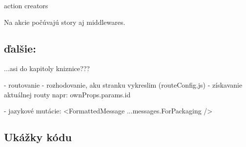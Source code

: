 action creators %

Na akcie počúvajú story aj middlewares.

\subsection{ďalšie:}

...asi do kapitoly kniznice???

- routovanie
  - rozhodovanie, aku stranku vykreslim (routeConfig.js)
  - získavanie aktuálnej routy %
  napr: ownProps.params.id

- jazykové mutácie: <FormattedMessage {...messages.ForPackaging} />

\subsection{Ukážky kódu}



